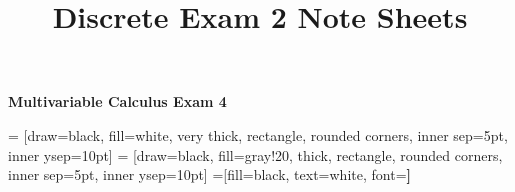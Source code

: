 \documentclass{article}
\title{Discrete Exam 2 Note Sheets}
\newcommand{\dydx}{\tfrac{dy}{dx}}
\begin{document}
\begin{center}{\huge{\textbf{Multivariable Calculus Exam 4}}}\\
\end{center}
\begin{multicols*}{2}

     = [draw=black, fill=white, very thick,
    rectangle, rounded corners, inner sep=5pt, inner ysep=10pt]
     = [draw=black, fill=gray!20, thick,
    rectangle, rounded corners, inner sep=5pt, inner ysep=10pt]
     =[fill=black, text=white, font=\bfseries]


\end{multicols*}
\end{document}
